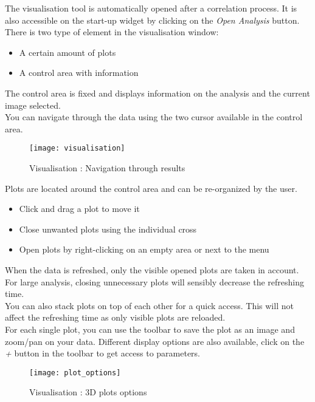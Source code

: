 \indent\indent The visualisation tool is automatically opened after a correlation process. It is also accessible on the start-up widget by clicking on the \textit{Open Analysis} button.\\
\newline
There is two type of element in the visualisation window:
\begin{itemize}
  \item A certain amount of plots
  \item A control area with information
\end{itemize}
\newline
The control area is fixed and displays information on the analysis and the current image selected.\\
You can navigate through the data using the two cursor available in the control area.\\

\begin{figure}[!h]
   \centering
   \texttt{[image: visualisation]}
   \caption{Visualisation : Navigation through results}
\end{figure}

\newline
\noindent Plots are located around the control area and can be re-organized by the user.
\begin{itemize}
  \item Click and drag a plot to move it
  \item Close unwanted plots using the individual cross
  \item Open plots by right-clicking on an empty area or next to the menu
\end{itemize}
\newline
When the data is refreshed, only the visible opened plots are taken in account. For large analysis, closing unnecessary plots will sensibly decrease the refreshing time.\\
You can also stack plots on top of each other for a quick access. This will not affect the refreshing time as only visible plots are reloaded.\\
\newline
For each single plot, you can use the toolbar to save the plot as an image and zoom/pan on your data. Different display options are also available, click on the \textit{+} button in the toolbar to get access to parameters.
\vspace{.5cm}
\begin{figure}[!h]
   \centering
   \texttt{[image: plot\_options]}
   \caption{Visualisation : 3D plots options}
\end{figure}
